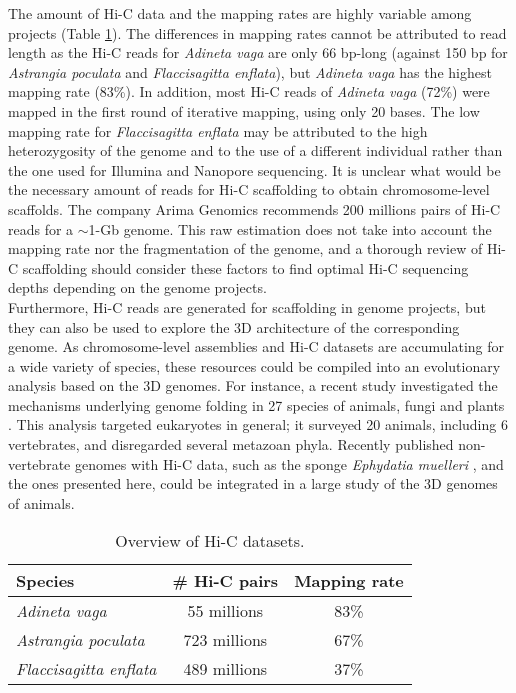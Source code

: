 The amount of Hi-C data and the mapping rates are highly variable among projects (Table \ref{tab:hic_data}). The differences in mapping rates cannot be attributed to read length as the Hi-C reads for \textit{Adineta vaga} are only 66 bp-long (against 150 bp for \textit{Astrangia poculata} and \textit{Flaccisagitta enflata}), but \textit{Adineta vaga} has the highest mapping rate (83\%). In addition, most Hi-C reads of \textit{Adineta vaga} (72\%) were mapped in the first round of iterative mapping, using only 20 bases. The low mapping rate for \textit{Flaccisagitta enflata} may be attributed to the high heterozygosity of the genome and to the use of a different individual rather than the one used for Illumina and Nanopore sequencing. It is unclear what would be the necessary amount of reads for Hi-C scaffolding to obtain chromosome-level scaffolds. The company Arima Genomics recommends 200 millions pairs of Hi-C reads for a $\sim$1-Gb genome. This raw estimation does not take into account the mapping rate nor the fragmentation of the genome, and a thorough review of Hi-C scaffolding should consider these factors to find optimal Hi-C sequencing depths depending on the genome projects. \\

Furthermore, Hi-C reads are generated for scaffolding in genome projects, but they can also be used to explore the 3D architecture of the corresponding genome. As chromosome-level assemblies and Hi-C datasets are accumulating for a wide variety of species, these resources could be compiled into an evolutionary analysis based on the 3D genomes. For instance, a recent study investigated the mechanisms underlying genome folding in 27 species of animals, fungi and plants \cite{hic_genomes}. This analysis targeted eukaryotes in general; it surveyed 20 animals, including 6 vertebrates, and disregarded several metazoan phyla. Recently published non-vertebrate genomes with Hi-C data, such as the sponge \textit{Ephydatia muelleri} \cite{ephydatia_mulleri}, and the ones presented here, could be integrated in a large study of the 3D genomes of animals. \\

\begin{table}
\centering
\begin{tabular}{lcc}
\hline
\textbf{Species} & \textbf{\# Hi-C pairs} & \textbf{Mapping rate} \\
\hline
\textit{Adineta vaga} & 55 millions & 83\% \\
\textit{Astrangia poculata} & 723 millions & 67\% \\
\textit{Flaccisagitta enflata} & 489 millions & 37\% \\
\hline
\end{tabular}
\caption{Overview of Hi-C datasets.}
\label{tab:hic_data}
\end{table}


